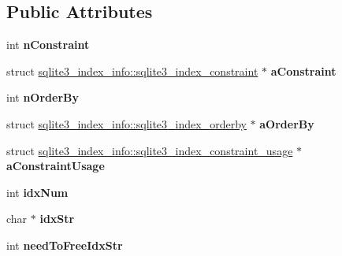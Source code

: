 \subsection*{Public Attributes}
\begin{DoxyCompactItemize}
\item 
int {\bfseries n\+Constraint}\hypertarget{structsqlite3__index__info_ae861993a30ce914a5214eab2579d935a}{}\label{structsqlite3__index__info_ae861993a30ce914a5214eab2579d935a}

\item 
struct \hyperlink{structsqlite3__index__info_1_1sqlite3__index__constraint}{sqlite3\+\_\+index\+\_\+info\+::sqlite3\+\_\+index\+\_\+constraint} $\ast$ {\bfseries a\+Constraint}\hypertarget{structsqlite3__index__info_a634aa93834e2b47acf34454746c0f248}{}\label{structsqlite3__index__info_a634aa93834e2b47acf34454746c0f248}

\item 
int {\bfseries n\+Order\+By}\hypertarget{structsqlite3__index__info_a3ef850fdc57eddbc8189fe84d0a9044e}{}\label{structsqlite3__index__info_a3ef850fdc57eddbc8189fe84d0a9044e}

\item 
struct \hyperlink{structsqlite3__index__info_1_1sqlite3__index__orderby}{sqlite3\+\_\+index\+\_\+info\+::sqlite3\+\_\+index\+\_\+orderby} $\ast$ {\bfseries a\+Order\+By}\hypertarget{structsqlite3__index__info_a6823a68979e19d8e332389361e920ef9}{}\label{structsqlite3__index__info_a6823a68979e19d8e332389361e920ef9}

\item 
struct \hyperlink{structsqlite3__index__info_1_1sqlite3__index__constraint__usage}{sqlite3\+\_\+index\+\_\+info\+::sqlite3\+\_\+index\+\_\+constraint\+\_\+usage} $\ast$ {\bfseries a\+Constraint\+Usage}\hypertarget{structsqlite3__index__info_a79b8a969dd7d582fc2ea3c0fbc5adb56}{}\label{structsqlite3__index__info_a79b8a969dd7d582fc2ea3c0fbc5adb56}

\item 
int {\bfseries idx\+Num}\hypertarget{structsqlite3__index__info_afcee17707a1c147fbd55c23c807fdae3}{}\label{structsqlite3__index__info_afcee17707a1c147fbd55c23c807fdae3}

\item 
char $\ast$ {\bfseries idx\+Str}\hypertarget{structsqlite3__index__info_ac63f4ebfe8d9331b040fa9e0e47c9d70}{}\label{structsqlite3__index__info_ac63f4ebfe8d9331b040fa9e0e47c9d70}

\item 
int {\bfseries need\+To\+Free\+Idx\+Str}\hypertarget{structsqlite3__index__info_a5410066c067c3891cdf165c70cc4d6b1}{}\label{structsqlite3__index__info_a5410066c067c3891cdf165c70cc4d6b1}


\end{DoxyCompactItemize}
